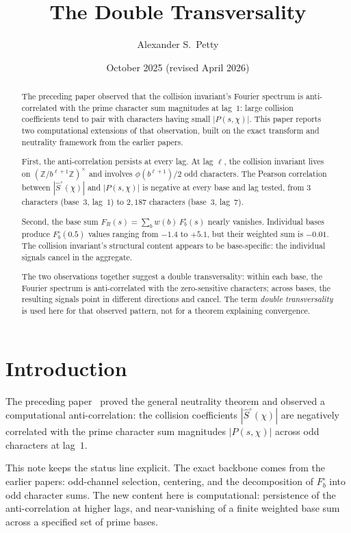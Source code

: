 \documentclass[12pt]{amsart}
\title{The Double Transversality}
\author{Alexander S.\ Petty}
\date{October 2025 (revised April 2026)}
\theoremstyle{definition}
\theoremstyle{remark}
\begin{document}
\begin{abstract}
The preceding paper observed that the collision
invariant's Fourier spectrum is anti-correlated with
the prime character sum magnitudes at lag~$1$: large
collision coefficients tend to pair with characters
having small $|P(s,\chi)|$. This paper reports two
computational extensions of that observation, built on
the exact transform and neutrality framework from the
earlier papers.

First, the anti-correlation persists at every lag. At
lag $\ell$, the collision invariant lives on
$(\mathbb{Z}/b^{\ell+1}\mathbb{Z})^{\times}$ and
involves $\phi(b^{\ell+1})/2$ odd characters. The
Pearson correlation between
$|\hat{S}^{\circ}(\chi)|$ and $|P(s, \chi)|$ is
negative at every base and lag tested, from $3$
characters (base~$3$, lag~$1$) to $2{,}187$ characters
(base~$3$, lag~$7$).

Second, the base sum $F_R(s) = \sum_b w(b)\,
F^{\circ}_b(s)$ nearly vanishes. Individual bases
produce $F^{\circ}_b(0.5)$ values ranging from $-1.4$
to $+5.1$, but their weighted sum is $-0.01$. The
collision invariant's structural content appears to be
base-specific: the individual signals cancel in the
aggregate.

The two observations together suggest a double
transversality: within each base, the Fourier spectrum
is anti-correlated with the zero-sensitive characters;
across bases, the resulting signals point in different
directions and cancel. The term \emph{double
transversality} is used here for that observed
pattern, not for a theorem explaining convergence.
\end{abstract}
\maketitle

\section{Introduction}

The preceding paper~\cite{paper19} proved the general
neutrality theorem and observed a computational
anti-correlation: the collision coefficients
$|\hat{S}^{\circ}(\chi)|$ are negatively correlated
with the prime character sum magnitudes
$|P(s, \chi)|$ across odd characters at lag~$1$.

This note keeps the status line explicit. The exact
backbone comes from the earlier papers: odd-channel
selection, centering, and the decomposition of
$F^{\circ}_b$ into odd character sums. The new content
here is computational: persistence of the
anti-correlation at higher lags, and near-vanishing of
a finite weighted base sum across a specified set of
prime bases.
\end{document}
